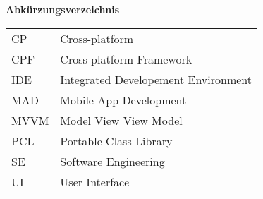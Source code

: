 %
%
% 
% 

\begin{center}
{\Large\bfseries Abkürzungsverzeichnis}
\end{center}

\begin{table*}[htbp]
		\begin{tabular}{ll}
			CP  &	Cross-platform \\
			CPF &	Cross-platform Framework \\
			IDE	&	Integrated Developement Environment\\
			MAD &	Mobile App Development \\
			MVVM&	Model View View Model\\
			PCL	&	Portable Class Library\\
			SE	&	Software Engineering\\
			UI	&	User Interface\\
		\end{tabular}
\end{table*}